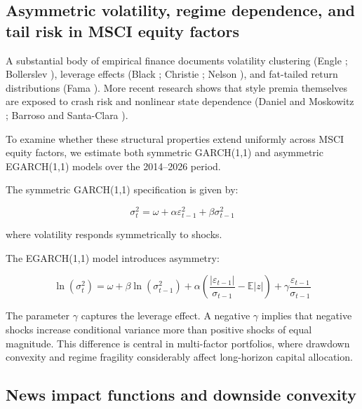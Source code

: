 \documentclass{article}
\begin{document}
\subsection{Asymmetric volatility, regime dependence, and tail risk in MSCI equity factors}

A substantial body of empirical finance documents volatility clustering (Engle \cite{engle1982}; Bollerslev \cite{bollerslev1986}), leverage effects (Black \cite{black1976}; Christie \cite{christie1982}; Nelson \cite{nelson1991}), and fat-tailed return distributions (Fama \cite{fama1993}). More recent research shows that style premia themselves are exposed to crash risk and nonlinear state dependence (Daniel and Moskowitz \cite{daniel2016}; Barroso and Santa-Clara \cite{barroso2015}). 

To examine whether these structural properties extend uniformly across MSCI equity factors, we estimate both symmetric GARCH(1,1) and asymmetric EGARCH(1,1) models over the 2014–2026 period.

The symmetric GARCH(1,1) specification is given by:

\begin{equation}
\sigma_t^2 = \omega + \alpha \varepsilon_{t-1}^2 + \beta \sigma_{t-1}^2
\end{equation}

where volatility responds symmetrically to shocks.

The EGARCH(1,1) model introduces asymmetry:

\begin{equation}
\ln(\sigma_t^2) = \omega + \beta \ln(\sigma_{t-1}^2)
+ \alpha \left( \frac{|\varepsilon_{t-1}|}{\sigma_{t-1}} - \mathbb{E}|z| \right)
+ \gamma \frac{\varepsilon_{t-1}}{\sigma_{t-1}}
\end{equation}

The parameter $\gamma$ captures the leverage effect. A negative $\gamma$ implies that negative shocks increase conditional variance more than positive shocks of equal magnitude. This difference is central in multi-factor portfolios, where drawdown convexity and regime fragility considerably affect long-horizon capital allocation.

\subsection{News impact functions and downside convexity}
\end{document}
